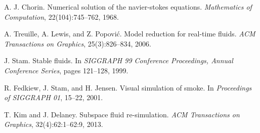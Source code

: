 \documentclass[aspectratio=169,dvipdfmx,hyperref={bookmarks=true}]{beamer}
\begin{document}
\begin{thebibliography}{99}
\beamertemplatetextbibitems

A. J. Chorin. Numerical solution of the navier-stokes equations. \textit{Mathematics of Computation}, 22(104):745--762, 1968.

A. Treuille, A. Lewis, and Z. Popovi\'{c}. Model reduction for real-time fluids. \textit{ACM Transactions on Graphics}, 25(3):826--834, 2006.

J. Stam. Stable fluids. In \textit{SIGGRAPH 99 Conference Proceedings, Annual Conference Series}, pages 121--128, 1999.

R. Fedkiew, J. Stam, and H. Jensen. Visual simulation of smoke. In \textit{Proceedings of SIGGRAPH 01}, 15--22, 2001.

T. Kim and J. Delaney. Subspace fluid re-simulation. \textit{ACM Transactions on Graphics}, 32(4):62:1--62:9, 2013.


\end{thebibliography}
\end{document}
